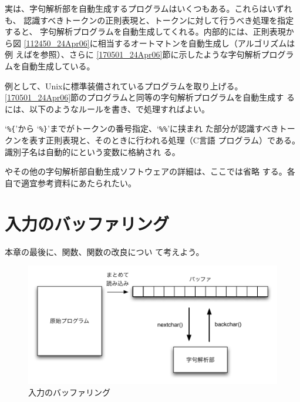 実は、字句解析部を自動生成するプログラムはいくつもある。これらはいずれも、
認識すべきトークンの正則表現と、トークンに対して行うべき処理を指定すると、
字句解析プログラムを自動生成してくれる。内部的には、正則表現から図
\ref{112450_24Apr06}に相当するオートマトンを自動生成し（アルゴリズムは例
えば\cite{ホップクロフト03:automaton}を参照）、さらに
\ref{170501_24Apr06}節に示したような字句解析プログラムを自動生成している。

例として、Unixに標準装備されているプログラムを取り上げる。
\ref{170501_24Apr06}節のプログラムと同等の字句解析プログラムを自動生成す
るには、以下のようなルールを書き、で処理すればよい。

\begin{quote}
 
\end{quote}

`\verb|%{|'から `\verb|%}|'までがトークンの番号指定、`\verb|%%|'に挟まれ
た部分が認識すべきトークンを表す正則表現と、そのときに行われる処理（C言語
プログラム）である。識別子名は自動的にという変数に格納され
る。

やその他の字句解析部自動生成ソフトウェアの詳細は、ここでは省略
する。各自で適宜参考資料にあたられたい。

\section{入力のバッファリング}

本章の最後に、関数、関数の改良につい
て考えよう。

\begin{figure}
 \begin{center}
  \includegraphics[width=13cm]{figure/buffering.pdf}
 \end{center}
 \caption{入力のバッファリング}
 \label{175102_24Apr06}
\end{figure}

